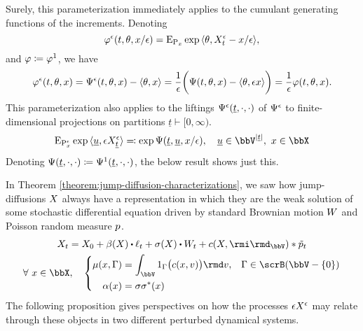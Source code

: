 Surely, this parameterization immediately applies to the cumulant generating functions of the increments.
Denoting
\begin{equation*}
  \varphi^\epsilon(t, \theta, x/\epsilon) = {\operatorname{E}}_{{\operatorname{P}}_x} \exp{\langle \theta, X^\epsilon_t-x/\epsilon \rangle},
\end{equation*}
and $\varphi \coloneqq \varphi^1$, we have
\begin{equation*}
  \varphi^\epsilon(t, \theta, x) = \Psi^\epsilon(t, \theta, x) - {\langle \theta , x \rangle} = \frac1\epsilon \bigg( \Psi(t, \theta, x) - {\langle \theta , \epsilon x \rangle} \bigg) = \frac1\epsilon \varphi(t, \theta, x).
\end{equation*}
This parameterization also applies to the liftings $\Psi^\epsilon(\underline t, \cdot, \cdot)$ of $\Psi^\epsilon$ to finite-dimensional projections on partitions $\underline t \vdash [0,\infty)$.
\begin{equation*}
  \Exp_{\Prb^\epsilon_\stateVar}\exp\prj{\underline\momentVar}{\Xe_{\underline t}} \eqdef \exp\aff(\underline t, \underline\momentVar, \stateVar/\epsilon), \quad \underline\momentVar \in \vecSpace^{|\underline t|}, ~ \stateVar\in \stateSpace
\end{equation*}
Denoting $\Psi(\underline t, \cdot, \cdot) \coloneqq \Psi^1(\underline t, \cdot, \cdot)$, the below result shows just this.



In Theorem \ref{theorem:jump-diffusion-characterizations}, we saw how jump-diffusions $X$ always have a representation in which they are the weak solution of some stochastic differential equation driven by standard Brownian motion $W$ and Poisson random measure $p$.
\begin{gather}
  \label{eq:sde-reminder}
  \X_t = \X_0 + \affDrift(\X) \shortInt \leb_t + \affDiffSqrt(\X) \shortInt \W_t + \thinner(\X, \id_\vecSpace) \ast \compensate{\poisRM}_t \\
  \forall ~ \stateVar \in \stateSpace, \quad \left\{\begin{aligned}
    \affJump(\stateVar, \Gamma) &= \int_\vecSpace 1_\Gamma\big(\thinner(\stateVar, \markVar)\big) \rmd\markVar, & \Gamma \in \scrB(\vecSpace-\{0\}) \\
    \affDiff(\stateVar) &= \affDiffSqrt\affDiffSqrt^*(\stateVar)
  \end{aligned}\right.
\end{gather}
The following proposition gives perspectives on how the processes $\epsilon X^\epsilon$ may relate through these objects in two different perturbed dynamical systems.


